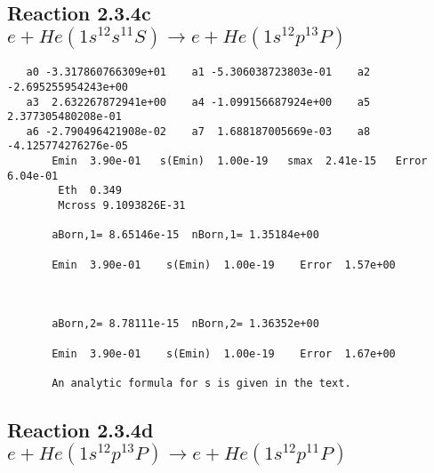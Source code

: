 \documentclass[12pt,dvipdfm]{article}
\begin{document}
\newpage
\subsection{
Reaction 2.3.4c $e + He(1s^12s^11S) \rightarrow e + He(1s^12p^13P)$}

















\begin{small}\begin{verbatim}
   a0 -3.317860766309e+01    a1 -5.306038723803e-01    a2 -2.695255954243e+00
   a3  2.632267872941e+00    a4 -1.099156687924e+00    a5  2.377305480208e-01
   a6 -2.790496421908e-02    a7  1.688187005669e-03    a8 -4.125774276276e-05
       Emin  3.90e-01   s(Emin)  1.00e-19   smax  2.41e-15   Error  6.04e-01
        Eth  0.349
        Mcross 9.1093826E-31

       aBorn,1= 8.65146e-15  nBorn,1= 1.35184e+00

       Emin  3.90e-01    s(Emin)  1.00e-19    Error  1.57e+00



       aBorn,2= 8.78111e-15  nBorn,2= 1.36352e+00

       Emin  3.90e-01    s(Emin)  1.00e-19    Error  1.67e+00

       An analytic formula for s is given in the text.
\end{verbatim}\end{small}




\newpage
\subsection{
Reaction 2.3.4d $e + He(1s^12p^13P) \rightarrow e + He(1s^12p^11P)$}






\end{document}
